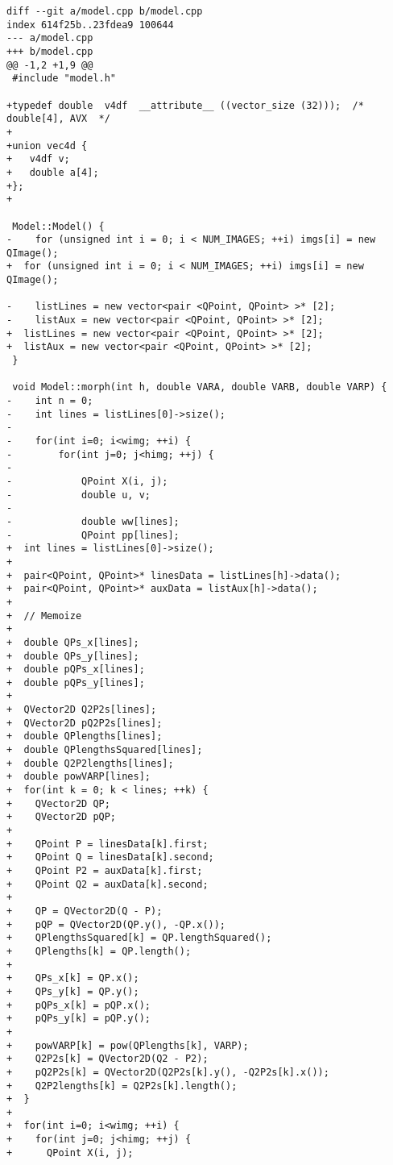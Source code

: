 \documentclass[12pt]{article}
\begin{document}
\begin{lstlisting}
diff --git a/model.cpp b/model.cpp
index 614f25b..23fdea9 100644
--- a/model.cpp
+++ b/model.cpp
@@ -1,2 +1,9 @@
 #include "model.h"
 
+typedef double  v4df  __attribute__ ((vector_size (32)));  /* double[4], AVX  */
+
+union vec4d {
+	v4df v;
+	double a[4];
+};
+

 Model::Model() {
-    for (unsigned int i = 0; i < NUM_IMAGES; ++i) imgs[i] = new QImage();
+  for (unsigned int i = 0; i < NUM_IMAGES; ++i) imgs[i] = new QImage();
 
-    listLines = new vector<pair <QPoint, QPoint> >* [2];
-    listAux = new vector<pair <QPoint, QPoint> >* [2];
+  listLines = new vector<pair <QPoint, QPoint> >* [2];
+  listAux = new vector<pair <QPoint, QPoint> >* [2];
 }
  
 void Model::morph(int h, double VARA, double VARB, double VARP) {
-    int n = 0;
-    int lines = listLines[0]->size();
-
-    for(int i=0; i<wimg; ++i) {
-        for(int j=0; j<himg; ++j) {
-            
-            QPoint X(i, j);
-            double u, v;
-            
-            double ww[lines];
-            QPoint pp[lines];
+  int lines = listLines[0]->size();
+  
+  pair<QPoint, QPoint>* linesData = listLines[h]->data();
+  pair<QPoint, QPoint>* auxData = listAux[h]->data();
+
+  // Memoize  
+
+  double QPs_x[lines];
+  double QPs_y[lines];  
+  double pQPs_x[lines];
+  double pQPs_y[lines];
+
+  QVector2D Q2P2s[lines];
+  QVector2D pQ2P2s[lines];
+  double QPlengths[lines];
+  double QPlengthsSquared[lines];
+  double Q2P2lengths[lines];
+  double powVARP[lines];
+  for(int k = 0; k < lines; ++k) {
+    QVector2D QP;
+    QVector2D pQP;
+    
+    QPoint P = linesData[k].first;
+    QPoint Q = linesData[k].second;
+    QPoint P2 = auxData[k].first;
+    QPoint Q2 = auxData[k].second;
+
+    QP = QVector2D(Q - P);
+    pQP = QVector2D(QP.y(), -QP.x());
+    QPlengthsSquared[k] = QP.lengthSquared();
+    QPlengths[k] = QP.length();
+    
+    QPs_x[k] = QP.x();
+    QPs_y[k] = QP.y();
+    pQPs_x[k] = pQP.x();
+    pQPs_y[k] = pQP.y();
+
+    powVARP[k] = pow(QPlengths[k], VARP);
+    Q2P2s[k] = QVector2D(Q2 - P2);
+    pQ2P2s[k] = QVector2D(Q2P2s[k].y(), -Q2P2s[k].x());
+    Q2P2lengths[k] = Q2P2s[k].length();
+  }
+
+  for(int i=0; i<wimg; ++i) {
+    for(int j=0; j<himg; ++j) {
+      QPoint X(i, j);
             

\end{lstlisting}
\end{document}
